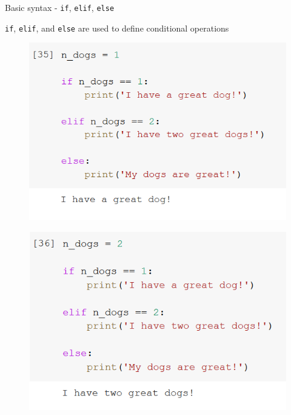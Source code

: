 \documentclass[aspectratio=169]{beamer}
\begin{document}
\begin{frame}{Basic syntax - \texttt{if}, \texttt{elif}, \texttt{else}}

	\texttt{if}, \texttt{elif}, and \texttt{else} are used to define conditional operations

	\begin{multicols}{3}

		\begin{figure}
			\centering
			\includegraphics[width=\linewidth]{img/if.png}
		\end{figure}
		\begin{figure}
			\centering
			\includegraphics[width=\linewidth]{img/elif.png}
		\end{figure}
		\begin{figure}
			\centering

\end{figure}
\end{multicols}
\end{frame}
\end{document}
